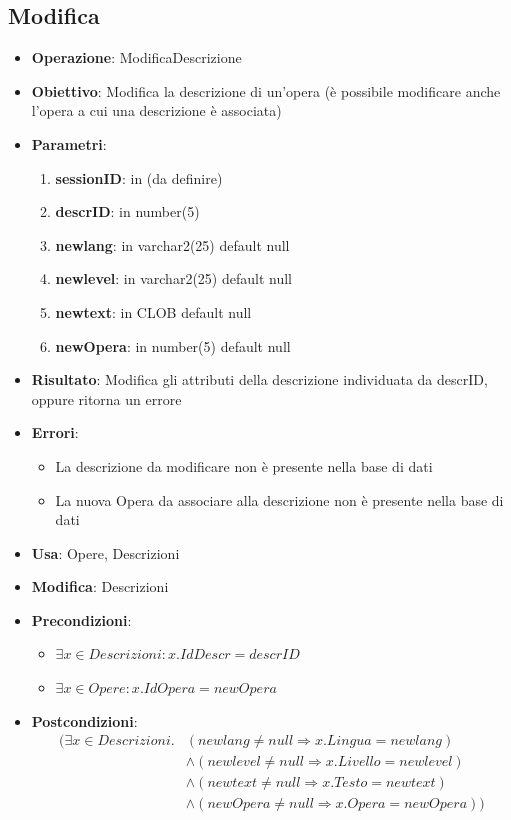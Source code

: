 \documentclass[a4paper,11pt]{article}
\begin{document}
\subsection{Modifica}
\begin{itemize}
	\item \textbf{Operazione}: ModificaDescrizione
	\item \textbf{Obiettivo}: Modifica la descrizione di un'opera (è possibile modificare anche l'opera a cui una descrizione è associata)
	\item \textbf{Parametri}:
	\begin{enumerate}
		\item \textbf{sessionID}: in (da definire)
		\item \textbf{descrID}: in number(5)
		\item \textbf{newlang}: in varchar2(25) default null
		\item \textbf{newlevel}: in varchar2(25) default null
		\item \textbf{newtext}: in CLOB default null
		\item \textbf{newOpera}: in number(5) default null
	\end{enumerate}
	\item \textbf{Risultato}: Modifica gli attributi della descrizione individuata da descrID, oppure ritorna un errore
	\item \textbf{Errori}: 
	\begin{itemize}
		\item La descrizione da modificare non è presente nella base di dati
		\item La nuova Opera da associare alla descrizione non è presente nella base di dati
	\end{itemize}
	\item \textbf{Usa}: Opere, Descrizioni
	\item \textbf{Modifica}: Descrizioni
	\item \textbf{Precondizioni}:
	\begin{itemize}
		\item $\exists x \in Descrizioni : x.IdDescr = descrID$
		\item $\exists x \in Opere : x.IdOpera = newOpera$
	\end{itemize}
	\item \textbf{Postcondizioni}:
		\begin{align*} (\exists x \in Descrizioni.
		& (newlang \ne null \Rightarrow x.Lingua = newlang) \\
		& \land (newlevel \ne null \Rightarrow x.Livello = newlevel) \\
		& \land (newtext \ne null \Rightarrow x.Testo = newtext) \\
		& \land (newOpera \ne null \Rightarrow x.Opera = newOpera))
		\end{align*}
\end{itemize}
\end{document}
